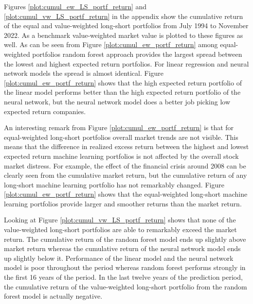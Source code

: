 \documentclass[12pt]{article}
\begin{document}
Figures \ref{plot:cumul_ew_LS_portf_return} and \ref{plot:cumul_vw_LS_portf_return} in the appendix show the cumulative return of the equal and value-weighted long-short portfolios from July 1994 to November 2022. As a benchmark value-weighted market value is plotted to these figures as well. As can be seen from Figure \ref{plot:cumul_ew_portf_return} among equal-weighted portfolios random forest approach provides the largest spread between the lowest and highest expected return portfolios. For linear regression and neural network models the spread is almost identical. Figure \ref{plot:cumul_ew_portf_return} shows that the high expected return portfolio of the linear model performs better than the high expected return portfolio of the neural network, but the neural network model does a better job picking low expected return companies. \par

An interesting remark from Figure \ref{plot:cumul_ew_portf_return} is that for equal-weighted long-short portfolios overall market trends are not visible. This means that the difference in realized excess return between the highest and lowest expected return machine learning portfolios is not affected by the overall stock market distress. For example, the effect of the financial crisis around 2008 can be clearly seen from the cumulative market return, but the cumulative return of any long-short machine learning portfolio has not remarkably changed. Figure \ref{plot:cumul_ew_portf_return} shows that the equal-weighted long-short machine learning portfolios provide larger and smoother returns than the market return. \par

Looking at Figure \ref{plot:cumul_vw_LS_portf_return} shows that none of the value-weighted long-short portfolios are able to remarkably exceed the market return. The cumulative return of the random forest model ends up slightly above market return whereas the cumulative return of the neural network model ends up slightly below it. Performance of the linear model and the neural network model is poor throughout the period whereas random forest performs strongly in the first 16 years of the period. In the last twelve years of the prediction period, the cumulative return of the value-weighted long-short portfolio from the random forest model is actually negative. \par
\end{document}

